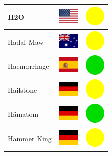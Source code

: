 \documentclass[12pt, a4paper, twoside]{report}
\begin{document}
\begin{center}
\begin{longtable}{|p{5cm}|p{2cm}|p{2cm}|}
 H2O                                                        & \includegraphics[width=1cm]{../4x3/us} &   \includegraphics[width=1cm]{../likes/m} \\ \hline
 Hadal Maw                                                  & \includegraphics[width=1cm]{../4x3/au} &   \includegraphics[width=1cm]{../likes/m} \\ \hline
 Haemorrhage                                                & \includegraphics[width=1cm]{../4x3/es} &   \includegraphics[width=1cm]{../likes/y} \\ \hline
 Hailstone                                                  & \includegraphics[width=1cm]{../4x3/de} &   \includegraphics[width=1cm]{../likes/m} \\ \hline
 Hämatom                                                    & \includegraphics[width=1cm]{../4x3/de} &   \includegraphics[width=1cm]{../likes/y} \\ \hline
 Hammer King                                                & \includegraphics[width=1cm]{../4x3/de} &   \includegraphics[width=1cm]{../likes/m} \\ \hline

\end{longtable}
\end{center}
\end{document}
